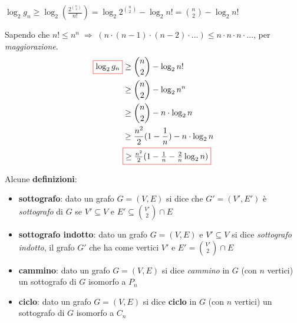 \begin{flushleft}
\begin{boxA}
        {\centering
            $\log_2 g_n \geq \log_2 (\frac{2^{\binom{n}{2}}}{n!}) = \log_2 2^{\binom{n}{2}} - \log_2 n! = \binom{n}{2} - \log_2 n!$
        \par}
        Sapendo che $n! \leq n^n \; \Rightarrow \; (n \cdot (n-1) \cdot (n-2) \cdot ...) \leq n \cdot n \cdot n \cdot ...$, per \textit{maggiorazione}.
        \begin{align*}
            \fcolorbox{red}{white}{$\log_2 g_n$} & \geq \binom{n}{2} - \log_2 n! \\
            & \geq \binom{n}{2} - \log_2 n^n \\
            & \geq \binom{n}{2} - n \cdot \log_2 n \\
            & \geq \frac{n^2}{2}(1 - \frac{1}{n}) - n \cdot \log_2 n \\
            & \fcolorbox{red}{white}{$\geq \frac{n^2}{2}(1 - \frac{1}{n} - \frac{2}{n} \log_2 n)$}
        \end{align*}
    \end{boxA}
    Alcune \textbf{definizioni}:
    \begin{itemize}[nosep]
        \item \textbf{sottografo}: dato un grafo $G = (V, E)$ si dice che $G' = (V', E')$ è \textit{sottografo} di $G$ se $V' \subseteq V$ e $E' \subseteq \binom{V'}{2} \cap E$
        \item \textbf{sottografo indotto}: dato un grafo $G = (V, E)$ e $V' \subseteq V$ si dice \textit{sottografo indotto}, il grafo $G'$ che ha come vertici $V'$ e $E' = \binom{V'}{2} \cap E$
        \item \textbf{cammino}: dato un grafo $G = (V, E)$ si dice \textit{cammino} in $G$ (con $n$ vertici) un sottografo  di $G$ isomorfo a $P_n$
        \item \textbf{ciclo}: dato un grafo $G = (V, E)$ si dice \textbf{ciclo} in $G$ (con $n$ vertici) un sottografo di $G$ isomorfo a $C_n$
    \end{itemize}
\end{flushleft}

